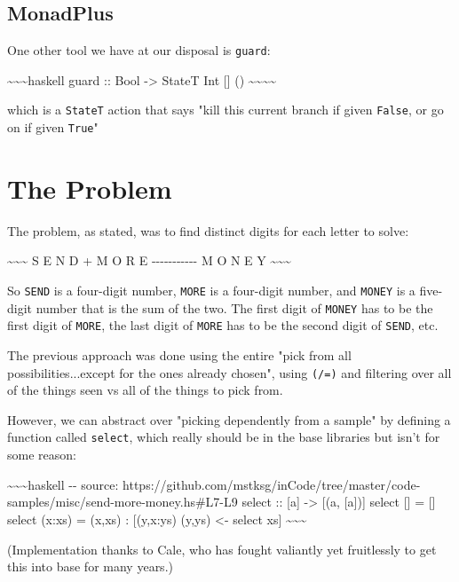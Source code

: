 \documentclass[]{article}
\begin{document}
\subsection{MonadPlus}

One other tool we have at our disposal is \texttt{guard}:

\textasciitilde{}\textasciitilde{}\textasciitilde{}haskell guard :: Bool
-\textgreater{} StateT Int {[}{]} ()
\textasciitilde{}\textasciitilde{}\textasciitilde{}\textasciitilde{}

which is a \texttt{StateT} action that says "kill this current branch if given
\texttt{False}, or go on if given \texttt{True}"

\section{The Problem}

The problem, as stated, was to find distinct digits for each letter to solve:

\textasciitilde{}\textasciitilde{}\textasciitilde{} S E N D + M O R E
-\/-\/-\/-\/-\/-\/-\/-\/-\/-\/- M O N E Y
\textasciitilde{}\textasciitilde{}\textasciitilde{}

So \texttt{SEND} is a four-digit number, \texttt{MORE} is a four-digit number,
and \texttt{MONEY} is a five-digit number that is the sum of the two. The first
digit of \texttt{MONEY} has to be the first digit of \texttt{MORE}, the last
digit of \texttt{MORE} has to be the second digit of \texttt{SEND}, etc.

The previous approach was done using the entire "pick from all
possibilities...except for the ones already chosen", using \texttt{(/=)} and
filtering over all of the things seen vs all of the things to pick from.

However, we can abstract over "picking dependently from a sample" by defining a
function called \texttt{select}, which really should be in the base libraries
but isn't for some reason:

\textasciitilde{}\textasciitilde{}\textasciitilde{}haskell -\/- source:
https://github.com/mstksg/inCode/tree/master/code-samples/misc/send-more-money.hs\#L7-L9
select :: {[}a{]} -\textgreater{} {[}(a, {[}a{]}){]} select {[}{]} = {[}{]}
select (x:xs) = (x,xs) : {[}(y,x:ys) \textbar{} (y,ys) \textless{}- select xs{]}
\textasciitilde{}\textasciitilde{}\textasciitilde{}

(Implementation thanks to Cale, who has fought valiantly yet fruitlessly to get
this into base for many years.)
\end{document}
